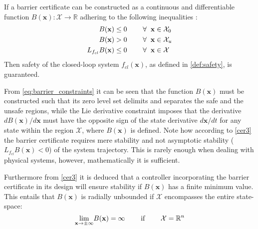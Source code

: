 \begin{defn}\label{def:barrier_certificate}	
If a barrier certificate can be constructed as a continuous and differentiable function $B(\mathbf{x}):\mathcal{X} \rightarrow \mathbb{R}$ adhering to the following inequalities  \citep{bib:prajna_framework}:
\begin{subequations}\label{eq:barrier_constraints}
\begin{flalign}
B(\mathbf{x}) &\leq 0 \hspace{0.8cm}  \forall \hspace{2mm} \mathbf{x} \in \mathcal{X}_0  \label{cer1}\\
B(\mathbf{x}) &> 0  \hspace{0.8cm}  \forall \hspace{2mm} \mathbf{x} \in \mathcal{X}_u \label{cer2} \\
L_{f_{cl}}B(\mathbf{x}) &\leq 0 \hspace{0.8cm}  \forall \hspace{2mm} \mathbf{x} \in \mathcal{X} \label{cer3}
\end{flalign}
\end{subequations}
Then safety of the closed-loop system $f_{cl}(\mathbf{x})$, as defined in \autoref{def:safety}, is guaranteed. 
\end{defn}


From \autoref{eq:barrier_constraints} it can be seen that the function $B(\mathbf{x})$ must be constructed such that its zero level set delimits and separates the safe and the unsafe regions, while the Lie derivative constraint imposes that the derivative $dB(\mathbf{x})/d\mathbf{x}$ must have the opposite sign of the state derivative $d\mathbf{x}/dt$ for any state within the region $\mathcal{X}$, where $B(\mathbf{x})$ is defined. 
Note how according to \autoref{cer3} the barrier certificate requires mere stability and not asymptotic stability ($L_{f_{cl}}B(\mathbf{x})<0$) of the system trajectory. This is rarely enough when dealing with physical systems, however, mathematically it is sufficient.

Furthermore from \autoref{cer3} it is deduced that a controller incorporating the barrier certificate in its design will ensure stability if $B(\mathbf{x})$ has a finite minimum value. This entails that $B(\mathbf{x}) $ is radially unbounded if $\mathcal{X}$ encompasses the entire state-space:
\begin{equation}
\underset{\mathbf{x}\rightarrow \pm\infty}{\lim} B(\mathbf{x})= \infty \hspace{0.8cm} \text{if} \hspace{0.8cm} \mathcal{X}=\mathbb{R}^n
\end{equation}

